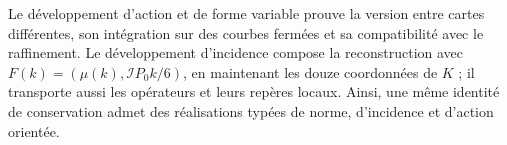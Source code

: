 Le développement d’action et de forme variable prouve la version entre cartes différentes, son intégration sur des courbes fermées et sa compatibilité avec le raffinement. Le développement d’incidence compose la reconstruction avec \(F(k)=(\mu(k),\mathcal I P_0k/6)\), en maintenant les douze coordonnées de \(K\) ; il transporte aussi les opérateurs et leurs repères locaux. Ainsi, une même identité de conservation admet des réalisations typées de norme, d’incidence et d’action orientée.

